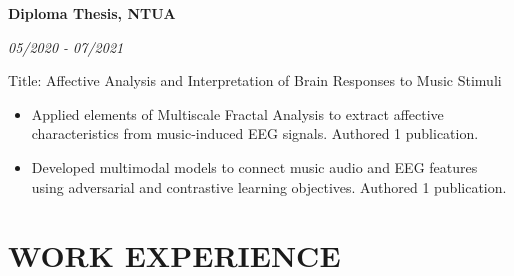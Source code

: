 \documentclass[margin]{res}
\newcommand{\cvheading}[2]{%
  \par\Needspace{4\baselineskip}\noindent
  \parbox[t]{\dimexpr\linewidth-110pt\relax}{\raggedright\bfseries #1}%
  \hfill\parbox[t]{98pt}{\raggedleft\itshape #2}%
  \par\nopagebreak[4]\vspace{-\parskip}\noindent\ignorespaces}
\begin{document}
\begin{resume}
\cvheading{Diploma Thesis, NTUA}{05/2020 - 07/2021}
Title: Affective Analysis and Interpretation of Brain Responses to Music Stimuli
\vspace{1mm}
\begin{itemize}
    \item Applied elements of Multiscale Fractal Analysis to extract affective characteristics from music-induced EEG signals. Authored 1 publication.
    \vspace{-1mm}
    \item Developed multimodal models to connect music audio and EEG features \\ using adversarial and contrastive learning objectives. Authored 1 publication.
\end{itemize}

\section{WORK EXPERIENCE}


\end{resume}
\end{document}
